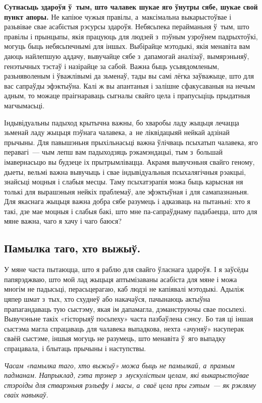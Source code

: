 \textbf{Сутнасьць здароўя ў~тым, што чалавек шукае яго ўнутры сябе, шукае свой пункт апоры.} Не капіюе чужыя правілы, а~максімальна выкарыстоўвае і разьвівае свае асабістыя рэсурсы здароўя. Небясьпека перайманьня ў~тым, што правілы і прынцыпы, якія працуюць для людзей з~пэўным узроўнем падрыхтоўкі, могуць быць небясьпечнымі для іншых. Выбірайце мэтодыкі, якія менавіта вам даюць найлепшую аддачу, вывучайце сябе з~дапамогай аналізаў, вымярэньняў, генэтычных тэстаў і назірайце за сабой. Важна быць усьвядомленым, разьняволеным і ўважлівымі да зьменаў, тады вы самі лёгка заўважыце, што для вас сапраўды эфэктыўна. Калі ж вы апантаныя і залішне сфакусаваныя на нечым адным, то можаце праігнараваць сыгналы свайго цела і прапусьціць прыдатныя магчымасьці.

Індывідуальны падыход крытычна важны, бо хваробы ладу жыцьця лечацца зьменай ладу жыцьця пэўнага чалавека, а~не ліквідацыяй нейкай адзінай прычыны. Для павышэньня прыхільнасьці важна ўлічваць псыхатып чалавека, яго перавагі~--- чым лепш вам падыходзяць рэкамэндацыі, тым з~большай імавернасьцю вы будзеце іх прытрымлівацца. Акрамя вывучэньня свайго геному, дыеты, вельмі важна вывучыць і свае індывідуальныя псыхалягічныя рэакцыі, знайсьці моцныя і слабыя месцы. Таму псыхатэрапія можа быць карысная ня толькі для вырашэньня нейкіх праблемаў, але эфэктыўная і для самапазнаньня. Для якаснага жыцьця важна добра сябе разумець і адказваць на пытаньні: хто я такі, дзе мае моцныя і слабыя бакі, што мне па-сапраўднаму падабаецца, што для мяне важна, чаго я хачу і чаго баюся?

\subsection*{Памылка таго, хто выжыў.}

У мяне часта пытаюцца, што я раблю для свайго ўласнага здароўя. І я заўсёды папярэджваю, што мой лад жыцьця аптымізаваны асабіста для мяне і можа многім не падысьці, перасьцерагаю, каб людзі не капіявалі мэтодыкі. Адыліж цяпер шмат з~тых, хто схуднеў або накачаўся, пачынаюць актыўна прапагандаваць тую сыстэму, якая ім дапамагла, дэманструючы свае посьпехі. Вывучэньне такіх «гісторыяў посьпеху» часта пазбаўлена сэнсу. Бо тая ці іншая сыстэма магла спрацаваць для чалавека выпадкова, нехта «ачуняў» насуперак сваёй сыстэме, іншыя могуць не разумець, што менавіта ў~яго выпадку спрацавала, і блытаць прычыны і наступствы.

\emph{Часам «памылка таго, хто выжыў» можа быць не памылкай, а~прамым падманам. Напрыклад, гэта трэнер з~мускулістым целам, які выкарыстоўвае стэроіды для стварэньня рэльефу і масы, а~сваё цела пры гэтым~--- як рэкляму сваіх навыкаў.}

